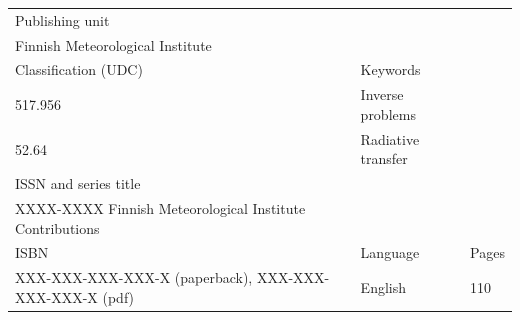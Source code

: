 \documentclass[11pt,b5paper]{book}
\newenvironment{changemargin}[3]{%
\begin{list}{}{
\setlength{\topsep}{0pt}
\setlength{\leftmargin}{#1}
\setlength{\rightmargin}{#2}
\setlength{\listparindent}{\parindent}
\setlength{\itemindent}{\parindent}
\setlength{\parsep}{\parskip}
}
\item[]}{\end{list}}
\begin{document}
\begin{changemargin}{-9mm}{-5mm}
\footnotesize
\noindent{}
\lipsum[1-3]
\begin{flushleft}
\begin{tabular}{p{9cm} p{3cm} p{1.3cm}}
  \hline
  {\scriptsize Publishing unit} & & \\
  Finnish Meteorological Institute & & \\
  \hline
  {\scriptsize Classification (UDC)} & {\scriptsize Keywords} & \\
  517.956 & Inverse problems & \\
  52.64 & Radiative transfer & \\
  \hline
  {\scriptsize ISSN and series title} & & \\
  XXXX-XXXX Finnish Meteorological Institute Contributions &  & \\
  \hline
  {\scriptsize ISBN} & {\scriptsize Language} & {\scriptsize Pages} \\
  XXX-XXX-XXX-XXX-X (paperback), XXX-XXX-XXX-XXX-X (pdf) & English & 110 \\
  \hline
\end{tabular}
\end{flushleft}

\end{changemargin}

\normalsize

\thispagestyle{empty}

\newpage

\thispagestyle{empty}

\end{document}
